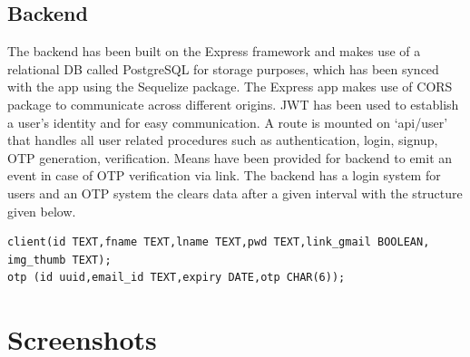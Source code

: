 \documentclass[12pt]{article}
\begin{document}
\subsection*{\Large{Backend}}

The backend has been built on the Express framework and makes use of a relational DB called PostgreSQL for storage purposes, which has been synced with the app using the Sequelize package. The Express app makes use of CORS package to communicate across different origins. JWT has been used to establish a user's identity and for easy communication. A route is mounted on `api/user' that handles all user related procedures such as authentication, login, signup, OTP generation, verification. Means have been provided for backend to emit an event in case of OTP verification via link. The backend has a login system for users and an OTP system the clears data after a given interval with the structure given below.

\begin{Verbatim}[frame=single]
client(id TEXT,fname TEXT,lname TEXT,pwd TEXT,link_gmail BOOLEAN,
img_thumb TEXT);
otp (id uuid,email_id TEXT,expiry DATE,otp CHAR(6));
\end{Verbatim}


\section*{\LARGE{Screenshots}}
\end{document}
